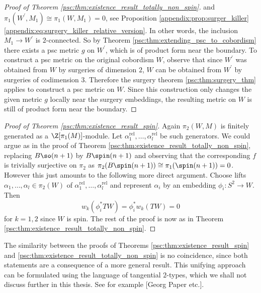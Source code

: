 \begin{proof}[Proof of Theorem \ref{psc:thm:existence_result_totally_non_spin}]
    and $\pi_1(W^\prime,M_1) \cong \pi_1(W,M_1) = 0$, see Proposition \ref{appendix:prop:surger_killer} \ref{appendix:eq:surgery_killer_relative_version}. In other words, the inclusion $M_1 \to W^\prime$ is $2$-connected. So by Theorem \ref{psc:thm:extending_psc_to_cobordism} there exists a psc metric $g$ on $W^\prime$, which is of product form near the boundary. To construct a psc metric on the original cobordism $W$, observe that since $W^\prime$ was obtained from $W$ by surgeries of dimension $2$, $W$ can be obtained from $W^\prime$ by surgeries of codimension $3$. Therefore the surgery theorem \ref{psc:thm:surgery_thm} applies to construct a psc metric on $W$. Since this construction only changes the given metric $g$ locally near the surgery embeddings, the resulting metric on $W$ is still of product form near the boundary. 
\end{proof}

\begin{proof}[Proof of Theorem \ref{psc:thm:existence_result_spin}]
    Again $\pi_2(W,M)$ is finitely generated as a $\Z[\pi_1(M)]$-module. Let $\alpha_1^\mathrm{rel},\ldots, \alpha_l^\mathrm{rel}$ be such generators. We could argue as in the proof of Theorem \ref{psc:thm:existence_result_totally_non_spin}, replacing $B\so(n+1)$ by $B\spin(n+1)$ and observing that the corresponding $f$ is trivially surjective on $\pi_2$ as $\pi_2(B\spin(n+1)) \cong \pi_1(\spin(n+1)) = 0$. However this just amounts to the following more direct argument. Choose lifts $\alpha_1,\ldots,\alpha_l \in \pi_2(W)$ of $\alpha_1^\mathrm{rel},\ldots, \alpha_l^\mathrm{rel}$ and represent $\alpha_i$ by an embedding $\phi_i \colon S^2 \to W$. Then 
    \[
    w_k(\phi_i^\ast TW) = \phi_i^\ast w_k(TW) = 0
    \]
    for $k = 1,2$ since $W$ is spin. The rest of the proof is now as in Theorem \ref{psc:thm:existence_result_totally_non_spin}.
\end{proof}

\begin{remark}
    The similarity between the proofs of Theorems \ref{psc:thm:existence_result_spin} and \ref{psc:thm:existence_result_totally_non_spin} is no coincidence, since both statements are a consequence of a more general result. This unifying approach can be formulated using the language of tangential $2$-types, which we shall not discuss further in this thesis. See for example [Georg Paper etc.].
\end{remark}



